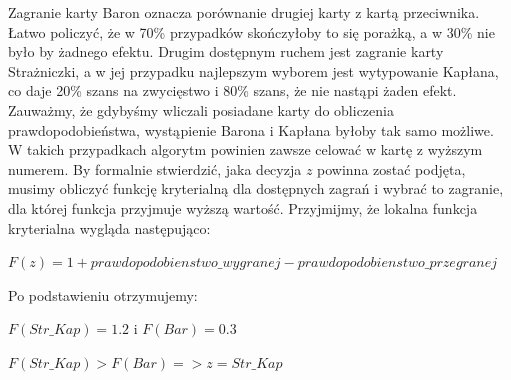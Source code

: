 Zagranie karty Baron oznacza porównanie drugiej karty z kartą przeciwnika. Łatwo policzyć, że w 70\% przypadków skończyłoby to się porażką, a w 30\% nie było by żadnego efektu. Drugim dostępnym ruchem jest zagranie karty Strażniczki, a w jej przypadku najlepszym wyborem jest wytypowanie Kapłana, co daje 20\% szans na zwycięstwo i 80\% szans, że nie nastąpi żaden efekt. Zauważmy, że gdybyśmy wliczali posiadane karty do obliczenia prawdopodobieństwa, wystąpienie Barona i Kapłana byłoby tak samo możliwe. W takich przypadkach algorytm powinien zawsze celować w kartę z wyższym numerem. By formalnie stwierdzić, jaka decyzja $z$ powinna zostać podjęta, musimy obliczyć funkcję kryterialną dla dostępnych zagrań i wybrać to zagranie, dla której funkcja przyjmuje wyższą wartość. Przyjmijmy, że lokalna funkcja kryterialna wygląda następująco:

\begin{center}
	$F(z) = 1 + prawdopodobienstwo\_wygranej - prawdopodobienstwo\_przegranej$
\end{center}
Po podstawieniu otrzymujemy:
\begin{center}
 $F(Str\_Kap)=1.2$ i $F(Bar) = 0.3$
 
 $F(Str\_Kap)>F(Bar) => z = Str\_Kap$ 
\end{center} 


